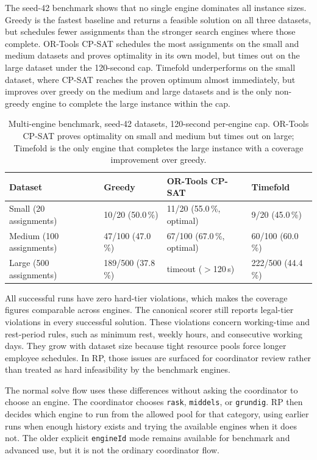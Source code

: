 The seed-42 benchmark shows that no single engine dominates all instance sizes. Greedy is the fastest baseline and returns a feasible solution on all three datasets, but schedules fewer assignments than the stronger search engines where those complete. OR-Tools CP-SAT schedules the most assignments on the small and medium datasets and proves optimality in its own model, but times out on the large dataset under the 120-second cap. Timefold underperforms on the small dataset, where CP-SAT reaches the proven optimum almost immediately, but improves over greedy on the medium and large datasets and is the only non-greedy engine to complete the large instance within the cap.

\begin{table}[h]
\centering
\caption{Multi-engine benchmark, seed-42 datasets, 120-second per-engine cap. OR-Tools CP-SAT proves optimality on small and medium but times out on large; Timefold is the only engine that completes the large instance with a coverage improvement over greedy.}
\label{tab:benchmark-results}
\small
\begin{tabular}{llll}
\toprule
\textbf{Dataset} & \textbf{Greedy} & \textbf{OR-Tools CP-SAT} & \textbf{Timefold} \\
\midrule
Small  (20 assignments)  & 10/20 (50.0\,\%)   & 11/20 (55.0\,\%, optimal)   & 9/20 (45.0\,\%) \\
\midrule
Medium (100 assignments) & 47/100 (47.0\,\%)  & 67/100 (67.0\,\%, optimal)  & 60/100 (60.0\,\%) \\
\midrule
Large  (500 assignments) & 189/500 (37.8\,\%) & timeout ($>$120\,s)         & 222/500 (44.4\,\%) \\
\bottomrule
\end{tabular}
\end{table}

All successful runs have zero hard-tier violations, which makes the coverage figures comparable across engines. The canonical scorer still reports legal-tier violations in every successful solution. These violations concern working-time and rest-period rules, such as minimum rest, weekly hours, and consecutive working days. They grow with dataset size because tight resource pools force longer employee schedules. In RP, those issues are surfaced for coordinator review rather than treated as hard infeasibility by the benchmark engines.

The normal solve flow uses these differences without asking the coordinator to choose an engine. The coordinator chooses \texttt{rask}, \texttt{middels}, or \texttt{grundig}. RP then decides which engine to run from the allowed pool for that category, using earlier runs when enough history exists and trying the available engines when it does not. The older explicit \texttt{engineId} mode remains available for benchmark and advanced use, but it is not the ordinary coordinator flow.

